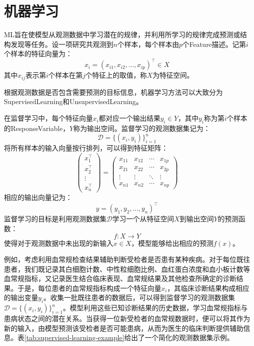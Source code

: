 \chapter{机器学习}

\gls{ML}旨在使模型从观测数据中学习潜在的规律，并利用所学习的规律完成预测或结构发现等任务。设一项研究共观测到$n$个样本，每个样本由$p$个\gls{Feature}描述。记第$i$个样本的特征向量为：
\begin{equation*}
	x_i=(x_{i1},x_{i2},\ldots,x_{ip})^{\top}\in X
\end{equation*}
其中$x_{ij}$表示第$i$个样本在第$j$个特征上的取值，称$X$为特征空间。\par
根据观测数据是否包含需要预测的目标信息，机器学习方法可以大致分为\gls{SupervisedLearning}和\gls{UnsupervisedLearning}。\par
在监督学习中，每个特征向量$x_i$都对应一个输出结果$y_i\in Y$，其中$y_i$称为第$i$个样本的\gls{ResponseVariable}，$Y$称为输出空间。监督学习的观测数据集记为：
\begin{equation*}
	\mathcal{D}=\{(x_i,y_i)\}_{i=1}^n
\end{equation*}
将所有样本的输入向量按行排列，可以得到特征矩阵：
\begin{equation*}
	\begin{pmatrix}
		x_1^{\top} \\
		x_2^{\top} \\
		\vdots \\
		x_n^{\top}
	\end{pmatrix}
	=
	\begin{pmatrix}
		x_{11}&x_{12}&\cdots&x_{1p} \\
		x_{21}&x_{22}&\cdots&x_{2p} \\
		\vdots&\vdots&\ddots&\vdots \\
		x_{n1}&x_{n2}&\cdots&x_{np}
	\end{pmatrix}
\end{equation*}
相应的输出向量记为：
\begin{equation*}
	y=(y_1,y_2,\dots,y_n)^{\top}
\end{equation*}
监督学习的目标是利用观测数据集$\mathcal{D}$学习一个从特征空间$X$到输出空间$Y$的预测函数：
\begin{equation*}
	f:X\longrightarrow Y
\end{equation*}
使得对于观测数据中未出现的新输入$x\in X$，模型能够给出相应的预测$f(x)$。\par
例如，考虑利用血常规检查结果辅助判断受检者是否患有某种疾病。对于每位既往患者，我们既记录其白细胞计数、中性粒细胞比例、血红蛋白浓度和血小板计数等血常规指标，又记录医生结合临床表现、血常规结果及其他检查所确定的诊断结果。于是，每位患者的血常规指标构成一个特征向量$x_i$，其临床诊断结果构成相应的输出变量$y_i$。收集一批既往患者的数据后，可以得到监督学习的观测数据集$\mathcal{D}=\{(x_i,y_i)\}_{i=1}^n$。模型利用这些已知诊断结果的历史数据，学习血常规指标与患病状态之间的潜在关系。当获得一位新受检者的血常规数据时，便可以将其作为新的输入，由模型预测该受检者是否可能患病，从而为医生的临床判断提供辅助信息。表\ref{tab:supervised-learning-example}给出了一个简化的观测数据集示例。
